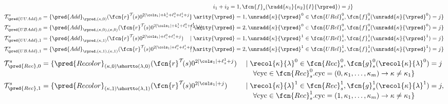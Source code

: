 \begin{definition}
\begin{itemize}
\begin{align*}
			&&& \hspace{3ex} i_1+i_2 = 1,\fcn{f}_s(\radd{\kappa_1}{\kappa_2}{I}{\rpred}) = j   \} \\
			\mathcal{T}_{\pred{UUAdd},0}^{s} &=  \{ \pred{Add}_{\rpred, (\kappa, 0)}(\fcn{r}^{\mathcal{T}}\!(s)0^{2|\cols_1| +k_s^1+\ell_s^0+\ell_s^1+j}) &&\hspace{-7ex}\mid \arity{\rpred} = 1,  \unradd{\kappa}{\rpred}^0\in\fcn{URel}_{s}^0,\fcn{f}_s^{0}(\unradd{\kappa}{\rpred}^{0}) = j   \} \\
\mathcal{T}_{\pred{UBAdd},0}^{s} &=  \{ \pred{Add}_{\rpred, (\kappa, 0), (\kappa, 0)}(\fcn{r}^{\mathcal{T}}\!(s)0^{2|\cols_1| +k_s^1+\ell_s^0+\ell_s^1+j}) \!\!\! &&\hspace{-7ex}\mid \arity{\rpred} = 2,  \unradd{\kappa}{\rpred}^0\in\fcn{URel}_{s}^0,\fcn{f}_s^{0}(\unradd{\kappa}{\rpred}^{0}) = j   \} \\
\mathcal{T}_{\pred{UUAdd},1}^{s} &=  \{ \pred{Add}_{\rpred, (\kappa, 1)}(\fcn{r}^{\mathcal{T}}\!(s)0^{2|\cols_1| +\ell_s^0+\ell_s^1+j}) &&\hspace{-7ex}\mid \arity{\rpred} = 1,  \unradd{\kappa}{\rpred}^1\in\fcn{URel}_{s}^1,\fcn{f}_s^{1}(\unradd{\kappa}{\rpred}^{1}) = j   \} \\
\mathcal{T}_{\pred{UBAdd},1}^{s} &=  \{ \pred{Add}_{\rpred, (\kappa, 1), (\kappa, 1)}(\fcn{r}^{\mathcal{T}}\!(s)0^{2|\cols_1| +\ell_s^0+\ell_s^1+j}) &&\hspace{-7ex}\mid \arity{\rpred} = 2,  \unradd{\kappa}{\rpred}^1\in\fcn{URel}_{s}^1,\fcn{f}_s^{1}(\unradd{\kappa}{\rpred}^{1}) = j   \} \\
		\end{align*}
\pagebreak
		\begin{align*}
			\mathcal{T}_{\pred{Rec}, 0}^{s} &=  \{ \pred{Recolor}_{(\kappa, 0)\shortto(\lambda, 0)}(\fcn{r}^{\mathcal{T}}\!(s)0^{2|\cols_1| + \ell_s^1+ j}) &&\mid \recol{\kappa}{\lambda}^{0}\in\fcn{Rec}_s^{0}, \fcn{g}_s^{0}(\recol{\kappa}{\lambda}^{0}) = j   \\[-1ex] &&& \hspace{3ex}\forall\mathrm{cyc}\in\fcn{Rec}_s^{0}. \mathrm{cyc} = (0, \kappa_1, \ldots, \kappa_m) \rightarrow \kappa \neq \kappa_1 \} \\
			\mathcal{T}_{\pred{Rec}, 1}^{s} &=  \{ \pred{Recolor}_{(\kappa, 1)\shortto(\lambda, 1)}(\fcn{r}^{\mathcal{T}}\!(s)0^{2|\cols_1|  + j}) &&\mid \recol{\kappa}{\lambda}^{1}\in\fcn{Rec}_s^{1},\fcn{g}_s^1(\recol{\kappa}{\lambda}^{1}) = j , \\[-1ex] &&& \hspace{3ex}\forall\mathrm{cyc}\in\fcn{Rec}_s^{1}. \mathrm{cyc} = (1, \kappa_1, \ldots, \kappa_m) \rightarrow \kappa \neq \kappa_1 \} \\

\end{align*}
\end{itemize}
\end{definition}
